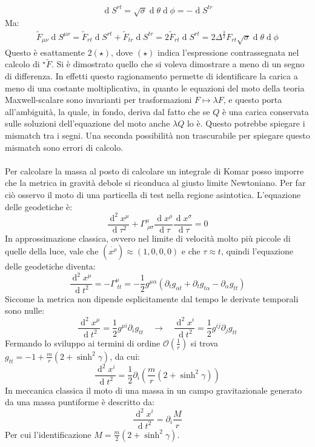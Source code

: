 \documentclass[]{scrartcl}
\newcommand{\pd}{\partial}
\renewcommand{\d}[1]{\ensuremath{\operatorname{d}\!{#1}}}
\renewcommand{\dd}[1]{\ensuremath{\operatorname{d}^2\!{#1}}}
\newcommand{\htF}{{}^\star \tilde{F}}
\begin{document}
\[
  \d S^{rt} = \sqrt{\sigma} \d \theta \d \phi = - \d S^{tr}
\]
Ma:
\begin{align*}
  \tilde{F}_{\mu\nu} \d S^{\mu\nu} = \tilde{F}_{rt} \d S^{rt} + \tilde{F}_{tr} \d S^{tr} = 2 \tilde{F}_{rt} \d S^{rt} = 2 \Delta^{\frac{3}{2}} F_{rt} \sqrt{\sigma} \d \theta \d \phi
\end{align*}
Questo è esattamente $ 2(\star) $, dove $ (\star) $ indica l'espressione contrassegnata nel calcolo di $ \htF $. Si è dimostrato quello che si voleva
dimostrare a meno di un segno di differenza. In effetti questo ragionamento permette di identificare la carica a meno di una costante moltiplicativa,
in quanto le equazioni del moto della teoria Maxwell-scalare sono invarianti per trasformazioni $ F \mapsto \lambda F $, e questo porta all'ambiguità,
la quale, in fondo, deriva dal fatto che se $ Q $ è una carica conservata sulle soluzioni dell'equazione del moto anche $ \lambda Q $ lo è.
Questo potrebbe spiegare i mismatch tra i segni. Una seconda possibilità non trascurabile per spiegare questo mismatch sono errori di calcolo. \\ \\
Per calcolare la massa al posto di calcolare un integrale di Komar posso imporre che la metrica in gravità debole si riconduca al giusto limite Newtoniano.
Per far ciò osservo il moto di una particella di test nella regione asintotica. L'equazione delle geodetiche è:
\[
  \frac{\dd{x^\mu}}{\d{\tau^2}} + \Gamma^\mu_{\; \rho\sigma} \frac{\d{x^\rho}}{\d{\tau}} \frac{\d{x^\sigma}}{\d{\tau}} = 0
\]
In approssimazione classica, ovvero nel limite di velocità molto più piccole di quelle della luce,  vale che $ (\dot{x^\rho}) \approx (1,0,0,0) $ e
che $ \tau \approx t $, quindi l'equazione delle geodetiche diventa:
\[
  \frac{\dd{x^\mu}}{\d{t^2}} = -\Gamma^\mu_{\; tt} = -\frac{1}{2}g^{\mu\alpha} (\pd_t g_{\alpha t} + \pd_t g_{t \alpha} - \pd_\alpha g_{tt} )
\]
Siccome la metrica non dipende esplicitamente dal tempo le derivate temporali sono nulle:
\[
  \frac{\dd{x^\mu}}{\d{t^2}} = \frac{1}{2}g^{\mu i} \pd_i g_{tt} \quad \rightarrow \quad  \frac{\dd{x^i}}{\d{t^2}} = \frac{1}{2}g^{i j}\pd_j g_{tt}
\]
Fermando lo sviluppo ai termini di ordine $ \mathcal{O}(\frac{1}{r}) $ si trova $ g_{tt} = - 1 + \frac{m}{r}(2 + \sinh^2 \gamma) $, da cui:
\[
  \frac{\dd{x^i}}{\d{t^2}} = \frac{1}{2} \pd_i \left(\frac{m}{r}(2 + \sinh^2 \gamma) \right)
\]
In meccanica classica il moto di una massa in un campo gravitazionale generato da una massa puntiforme è descritto da:
\[
  \frac{\dd{x^i}}{\d{t^2}} = \pd_i \frac{M}{r}
\]
Per cui l'identificazione $  M = \frac{m}{2} \left( 2 + \sinh^2 \gamma \right) $. \\ \\
\end{document}
